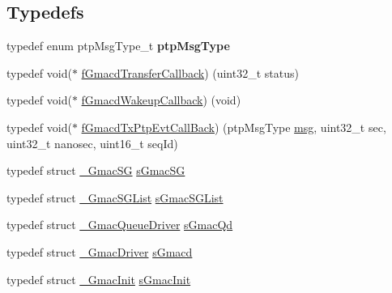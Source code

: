 \subsection*{Typedefs}
\begin{DoxyCompactItemize}
\item 
\mbox{\label{group__gmacd__types_ga044e5165b9a92af32dd0f0253f1270e5}} 
typedef enum ptp\+Msg\+Type\+\_\+t {\bfseries ptp\+Msg\+Type}
\item 
typedef void($\ast$ \mbox{\hyperlink{group__gmacd__types_ga64979042bf43f697de166e864e3259de}{f\+Gmacd\+Transfer\+Callback}}) (uint32\+\_\+t status)
\item 
typedef void($\ast$ \mbox{\hyperlink{group__gmacd__types_ga44e6be4bb53db0660baf6cb50b20a684}{f\+Gmacd\+Wakeup\+Callback}}) (void)
\item 
typedef void($\ast$ \mbox{\hyperlink{group__gmacd__types_gad3329dfe65f5877f50ee8a4fd8e63f08}{f\+Gmacd\+Tx\+Ptp\+Evt\+Call\+Back}}) (ptp\+Msg\+Type \mbox{\hyperlink{structmsg}{msg}}, uint32\+\_\+t sec, uint32\+\_\+t nanosec, uint16\+\_\+t seq\+Id)
\item 
typedef struct \mbox{\hyperlink{struct__GmacSG}{\+\_\+\+Gmac\+SG}} \mbox{\hyperlink{group__gmacd__types_gab4ca53499e3bb0601f44e59e17ec7a51}{s\+Gmac\+SG}}
\item 
typedef struct \mbox{\hyperlink{struct__GmacSGList}{\+\_\+\+Gmac\+S\+G\+List}} \mbox{\hyperlink{group__gmacd__types_ga97ea4785757f8d33d38ed0563d84bfa4}{s\+Gmac\+S\+G\+List}}
\item 
typedef struct \mbox{\hyperlink{struct__GmacQueueDriver}{\+\_\+\+Gmac\+Queue\+Driver}} \mbox{\hyperlink{group__gmacd__types_gaf703cfd044c83739379ae7ce3b9cbac5}{s\+Gmac\+Qd}}
\item 
typedef struct \mbox{\hyperlink{struct__GmacDriver}{\+\_\+\+Gmac\+Driver}} \mbox{\hyperlink{group__gmacd__types_gaa8760917079000a5ee7fbc7fab992dd3}{s\+Gmacd}}
\item 
typedef struct \mbox{\hyperlink{struct__GmacInit}{\+\_\+\+Gmac\+Init}} \mbox{\hyperlink{group__gmacd__types_ga5ab53aef1a598e4d862677f8f1928b20}{s\+Gmac\+Init}}
\end{DoxyCompactItemize}

